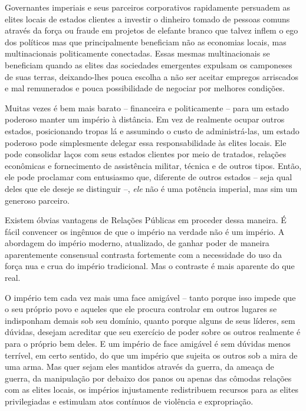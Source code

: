 Governantes imperiais e seus parceiros corporativos rapidamente persuadem as elites locais de estados clientes a investir o dinheiro tomado de pessoas comuns através da força ou fraude em projetos de elefante branco que talvez inflem o ego dos políticos mas que principalmente beneficiam não as economias locais, mas multinacionais politicamente conectadas. Essas mesmas multinacionais se beneficiam quando as elites das sociedades emergentes expulsam os camponeses de suas terras, deixando-lhes pouca escolha a não ser aceitar empregos arriscados e mal remunerados e pouca possibilidade de negociar por melhores condições. 

Muitas vezes é bem mais barato -- financeira e politicamente -- para um estado poderoso manter um império à distância. Em vez de realmente ocupar outros estados, posicionando tropas lá e assumindo o custo de administrá-las, um estado poderoso pode simplesmente delegar essa responsabilidade às elites locais. Ele pode consolidar laços com seus estados clientes por meio de tratados, relações econômicas e fornecimento de assistência militar, técnica e de outros tipos. Então, ele pode proclamar com entusiasmo que, diferente de outros estados -- seja qual deles que ele deseje se distinguir --, \emph{ele} não é uma potência imperial, mas sim um generoso parceiro.

Existem óbvias vantagens de Relações Públicas em proceder dessa maneira. É fácil convencer os ingênuos de que o império na verdade não é um império. A abordagem do império moderno, atualizado, de ganhar poder de maneira aparentemente consensual contrasta fortemente com a necessidade do uso da força nua e crua do império tradicional. Mas o contraste é mais aparente do que real.

O império tem cada vez mais uma face amigável -- tanto porque isso impede que o seu próprio povo e aqueles que ele procura controlar em outros lugares se indisponham demais sob seu domínio, quanto porque alguns de seus líderes, sem dúvidas, desejam acreditar que seu exercício de poder sobre os outros realmente é para o próprio bem deles. E um império de face amigável é sem dúvidas menos terrível, em certo sentido, do que um império que sujeita os outros sob a mira de uma arma. Mas quer sejam eles mantidos através da guerra, da ameaça de guerra, da manipulação por debaixo dos panos ou apenas das cômodas relações com as elites locais, os impérios injustamente redistribuem recursos para as elites privilegiadas e estimulam atos contínuos de violência e expropriação.

